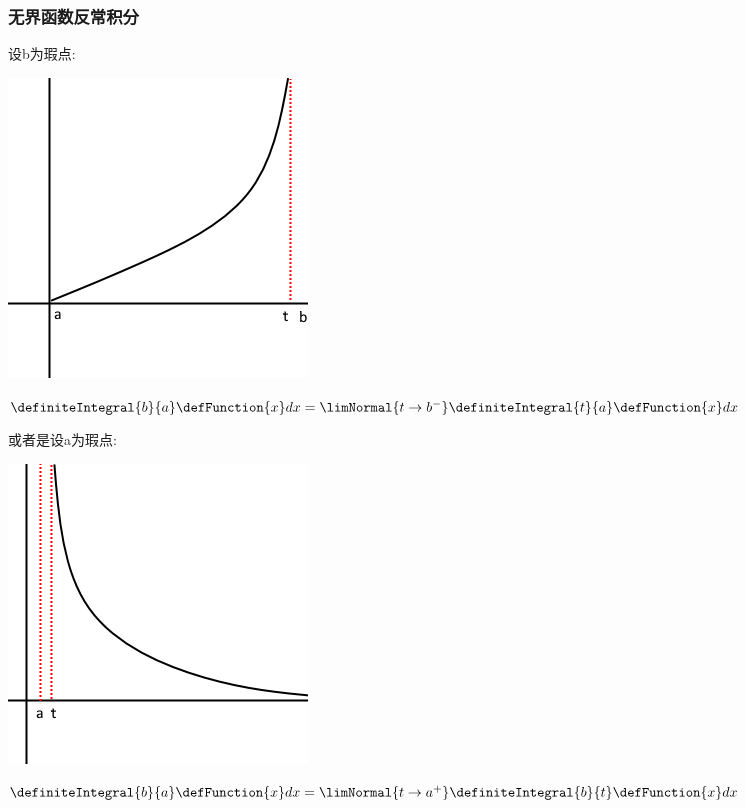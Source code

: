 {{{\subsubsection{无界函数反常积分}{

  设b为瑕点:

  \begin{center}
    \includegraphics[scale=0.5]{resources/infityFunctionUnormalIntegral.png}
  \end{center}

  $\definiteIntegral{b}{a}\defFunction{x}dx = \limNormal{t \to b^-}\definiteIntegral{t}{a}\defFunction{x}dx$

  或者是设a为瑕点:

  \begin{center}
    \includegraphics[scale=0.5]{resources/infityFunctionUnormalIntegral2.png}
  \end{center}

  $\definiteIntegral{b}{a}\defFunction{x}dx = \limNormal{t \to a^+}\definiteIntegral{b}{t}\defFunction{x}dx$

}}}}
